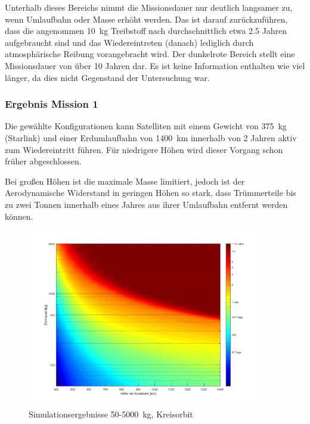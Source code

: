  Unterhalb dieses Bereichs nimmt die Missionsdauer nur deutlich langsamer zu, wenn Umlaufbahn oder Masse erhöht werden. Das ist darauf zurückzuführen, dass die angenommen \SI{10}{\kg} Treibstoff nach durchschnittlich etwa \num{2.5} Jahren aufgebraucht sind und das Wiedereintreten (danach) lediglich durch atmosphärische Reibung vorangebracht wird. Der dunkelrote Bereich stellt eine Missionsdauer von über \num{10} Jahren dar. Es ist keine Information enthalten wie viel länger, da dies nicht Gegenstand der Untersuchung war.

\subsubsection{Ergebnis Mission 1}
	

Die gewählte Konfigurationen kann Satelliten mit einem Gewicht von \SI{375}{\kilogram} (Starlink) und einer Erdumlaufbahn von \SI{1400}{\kilo\metre} innerhalb von \num{2} Jahren aktiv zum Wiedereintritt führen. Für niedrigere Höhen wird dieser Vorgang schon früher abgeschlossen. 

	Bei großen Höhen ist die maximale Masse limitiert, jedoch ist der Aerodynamische Widerstand in geringen Höhen so stark, dass Trümmerteile bis zu zwei Tonnen innerhalb eines Jahres aus ihrer Umlaufbahn entfernt werden können. 


\begin{figure}[t]
\centering
\includegraphics[width=0.90\textwidth]{./graphics/GMAT/GMAT_Mass_over_Height.png}
\caption{Simulationsergebnisse \num{50}-\SI{5000}{\kilogram}, Kreisorbit}
\label{fig:GMAT_Mass_over_Height}
\end{figure}

